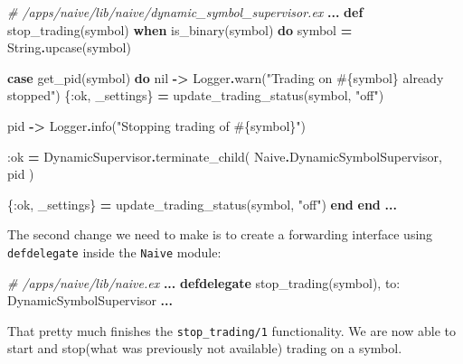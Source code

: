 \documentclass[
  oneside]{book}
\newenvironment{Shaded}{\begin{snugshade}}{\end{snugshade}}
\newcommand{\CommentTok}[1]{\textcolor[rgb]{0.56,0.35,0.01}{\textit{#1}}}
\newcommand{\ConstantTok}[1]{\textcolor[rgb]{0.00,0.00,0.00}{#1}}
\newcommand{\KeywordTok}[1]{\textcolor[rgb]{0.13,0.29,0.53}{\textbf{#1}}}
\newcommand{\NormalTok}[1]{#1}
\newcommand{\OperatorTok}[1]{\textcolor[rgb]{0.81,0.36,0.00}{\textbf{#1}}}
\newcommand{\OtherTok}[1]{\textcolor[rgb]{0.56,0.35,0.01}{#1}}
\newcommand{\StringTok}[1]{\textcolor[rgb]{0.31,0.60,0.02}{#1}}
\newcommand{\VariableTok}[1]{\textcolor[rgb]{0.00,0.00,0.00}{#1}}
\begin{document}
\begin{Shaded}
\begin{Highlighting}[]
\CommentTok{\# /apps/naive/lib/naive/dynamic\_symbol\_supervisor.ex}
  \OperatorTok{...}
  \KeywordTok{def}\NormalTok{ stop\_trading(symbol) }\KeywordTok{when}\NormalTok{ is\_binary(symbol) }\KeywordTok{do}
\NormalTok{    symbol }\OperatorTok{=} \ConstantTok{String}\OperatorTok{.}\NormalTok{upcase(symbol)}

    \KeywordTok{case}\NormalTok{ get\_pid(symbol) }\KeywordTok{do}
      \ConstantTok{nil} \OperatorTok{{-}\textgreater{}}
        \ConstantTok{Logger}\OperatorTok{.}\NormalTok{warn(}\StringTok{"Trading on }\OtherTok{\#\{}\NormalTok{symbol}\OtherTok{\}}\StringTok{ already stopped"}\NormalTok{)}
\NormalTok{        \{}\VariableTok{:ok}\NormalTok{, \_settings\} }\OperatorTok{=}\NormalTok{ update\_trading\_status(symbol, }\StringTok{"off"}\NormalTok{)}

\NormalTok{      pid }\OperatorTok{{-}\textgreater{}}
        \ConstantTok{Logger}\OperatorTok{.}\NormalTok{info(}\StringTok{"Stopping trading of }\OtherTok{\#\{}\NormalTok{symbol}\OtherTok{\}}\StringTok{"}\NormalTok{)}

        \VariableTok{:ok} \OperatorTok{=}
          \ConstantTok{DynamicSupervisor}\OperatorTok{.}\NormalTok{terminate\_child(}
            \ConstantTok{Naive}\OperatorTok{.}\ConstantTok{DynamicSymbolSupervisor}\NormalTok{,}
\NormalTok{            pid}
\NormalTok{          )}

\NormalTok{        \{}\VariableTok{:ok}\NormalTok{, \_settings\} }\OperatorTok{=}\NormalTok{ update\_trading\_status(symbol, }\StringTok{"off"}\NormalTok{)}
    \KeywordTok{end}
  \KeywordTok{end}
  \OperatorTok{...}
\end{Highlighting}
\end{Shaded}

The second change we need to make is to create a forwarding interface using \texttt{defdelegate} inside the \texttt{Naive} module:

\begin{Shaded}
\begin{Highlighting}[]
\CommentTok{\# /apps/naive/lib/naive.ex}
  \OperatorTok{...}
  \KeywordTok{defdelegate}\NormalTok{ stop\_trading(symbol), }\VariableTok{to:} \ConstantTok{DynamicSymbolSupervisor}
  \OperatorTok{...}
\end{Highlighting}
\end{Shaded}

That pretty much finishes the \texttt{stop\_trading/1} functionality. We are now able to start and stop(what was previously not available) trading on a symbol.
\end{document}
